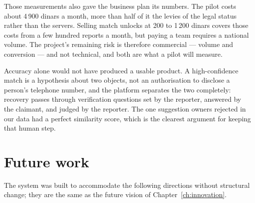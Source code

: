 Those measurements also gave the business plan its numbers. The pilot costs
about 4\,900 dinars a month, more than half of it the levies of the legal status
rather than the servers. Selling match unlocks at 200 to 1\,200 dinars covers
those costs from a few hundred reports a month, but paying a team requires a
national volume. The project's remaining risk is therefore commercial ---
volume and conversion --- and not technical, and both are what a pilot will
measure.

Accuracy alone would not have produced a usable product. A high-confidence match
is a hypothesis about two objects, not an authorisation to disclose a person's
telephone number, and the platform separates the two completely: recovery
passes through verification questions set by the reporter, answered by the
claimant, and judged by the reporter. The one suggestion owners rejected in our
data had a perfect similarity score, which is the clearest argument for keeping
that human step.

\section*{Future work}

The system was built to accommodate the following directions without structural
change; they are the same as the future vision of Chapter~\ref{ch:innovation}.


